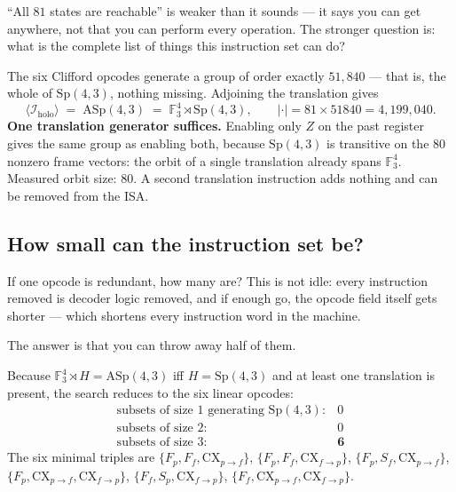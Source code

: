 \begin{plain}
``All $81$ states are reachable'' is weaker than it sounds --- it says you can get
anywhere, not that you can perform every operation. The stronger question is: what is the
complete list of things this instruction set can do?
\end{plain}

\begin{spec}
The six Clifford opcodes generate a group of order exactly $51{,}840$ --- that is, the
whole of $\mathrm{Sp}(4,3)$, nothing missing. Adjoining the translation gives
\[
  \langle \mathcal{I}_{\mathrm{holo}}\rangle
   \;=\; \mathrm{ASp}(4,3)\;=\;\mathbb{F}_3^4\rtimes\mathrm{Sp}(4,3),
  \qquad |\cdot| = 81\times 51840 = 4{,}199{,}040 .
\]
\textbf{One translation generator suffices.} Enabling only $Z$ on the past register gives
the same group as enabling both, because $\mathrm{Sp}(4,3)$ is transitive on the $80$
nonzero frame vectors: the orbit of a single translation already spans $\mathbb{F}_3^4$.
Measured orbit size: $80$. A second translation instruction adds nothing and can be
removed from the ISA.
\end{spec}


\subsection{How small can the instruction set be?}

\begin{plain}
If one opcode is redundant, how many are? This is not idle: every instruction removed is
decoder logic removed, and if enough go, the opcode field itself gets shorter --- which
shortens every instruction word in the machine.

The answer is that you can throw away half of them.
\end{plain}

\begin{spec}
Because $\mathbb{F}_3^4\rtimes H=\mathrm{ASp}(4,3)$ iff $H=\mathrm{Sp}(4,3)$ and at least
one translation is present, the search reduces to the six linear opcodes:
\[
\begin{array}{ll}
\text{subsets of size }1\text{ generating }\mathrm{Sp}(4,3): & 0\\
\text{subsets of size }2: & 0\\
\text{subsets of size }3: & \mathbf{6}
\end{array}
\]
The six minimal triples are
$\{F_p,F_f,\mathrm{CX}_{p\to f}\}$, $\{F_p,F_f,\mathrm{CX}_{f\to p}\}$,
$\{F_p,S_f,\mathrm{CX}_{p\to f}\}$, $\{F_p,\mathrm{CX}_{p\to f},\mathrm{CX}_{f\to p}\}$,
$\{F_f,S_p,\mathrm{CX}_{f\to p}\}$, $\{F_f,\mathrm{CX}_{p\to f},\mathrm{CX}_{f\to p}\}$.
\end{spec}

